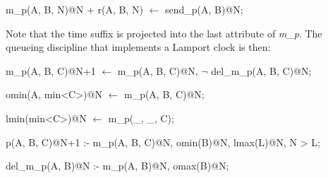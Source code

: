 \begin{Dedalus}
m\_p(A, B, N)@N + r(A, B, N) \(\leftarrow\)
  send\_p(A, B)@N;
\end{Dedalus}

Note that the time suffix is projected into the last attribute of \emph{m\_p}.  The queueing discipline that implements a
Lamport clock is then:

\begin{Dedalus}

m\_p(A, B, C)@N+1 \(\leftarrow\)
  m\_p(A, B, C)@N,
  \(\lnot\) del\_m\_p(A, B, C)@N;

omin(A, min<C>)@N \(\leftarrow\)
  m\_p(A, B, C)@N;

lmin(min<C>)@N \(\leftarrow\)
  m\_p(_, _, C);

p(A, B, C)@N+1 :-
  m\_p(A, B, C)@N,
  omin(B)@N,
  lmax(L)@N,
  N > L;

del\_m\_p(A, B)@N :-
  m\_p(A, B)@N,
  omax(B)@N;
  
\end{Dedalus}

